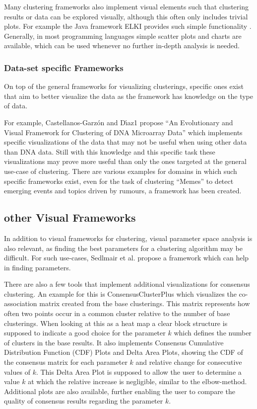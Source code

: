 \documentclass[
	a4paper,
	english,
	twoside,
	openright,               
	11pt                            
	]{report}
\begin{document}
Many clustering frameworks also implement visual elements such that clustering results or data can be explored visually, although this often only includes trivial plots. For example the Java framework ELKI provides such simple functionality \cite{10.14778/2824032.2824115}. Generally, in most programming languages simple scatter plots and charts are available, which can be used whenever no further in-depth analysis is needed.

\subsubsection{Data-set specific Frameworks}
On top of the general frameworks for visualizing clusterings, specific ones exist that aim to better visualize the data as the framework has knowledge on the type of data. 

For example, Castellanos-Garz\'{o}n and D\'{ı}az1 \cite{DNAVis} propose ``An Evolutionary and Visual Framework for Clustering of DNA Microarray Data'' which implements specific visualizations of the data that may not be useful when using other data than DNA data. Still with this knowledge and this specific task these visualizations may prove more useful than only the ones targeted at the general use-case of clustering. There are various examples for domains in which such specific frameworks exist, even for the task of clustering ``Memes'' \cite{Dang2017} to detect emerging events and topics driven by rumours, a framework has been created.

\subsection{other Visual Frameworks}

In addition to visual frameworks for clustering, visual parameter space analysis is also relevant, as finding the best parameters for a clustering algorithm may be difficult. For such use-cases, Sedlmair et al. \cite{6876043} propose a framework which can help in finding parameters.

There are also a few tools that implement additional visualizations for consensus clustering. An example for this is ConsensusClusterPlus \cite{10.1093/bioinformatics/btq170} which visualizes the co-association matrix created from the base clusterings. This matrix represents how often two points occur in a common cluster relative to the number of base clusterings. When looking at this as a heat map a clear block structure is supposed to indicate a good choice for the parameter $k$ which defines the number of clusters in the base results. It also implements Consensus Cumulative Distribution Function (CDF) Plots and Delta Area Plots, showing the CDF of the consensus matrix for each parameter $k$ and relative change for consecutive values of $k$. This Delta Area Plot is supposed to allow the user to determine a value $k$ at which the relative increase is negligible, similar to the elbow-method. Additional plots are also available, further enabling the user to compare the quality of consensus results regarding the parameter $k$.
\end{document}
